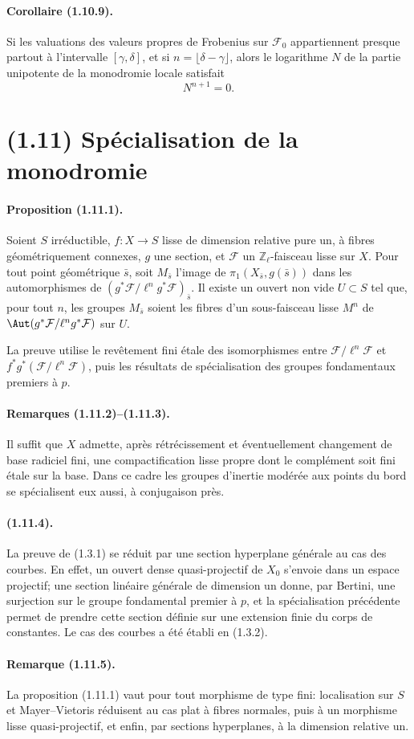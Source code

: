 \paragraph{Corollaire (1.10.9).}
Si les valuations des valeurs propres de Frobenius sur $\mathcal F_0$ appartiennent presque partout à l'intervalle $[\gamma,\delta]$, et si $n=\lfloor\delta-\gamma\rfloor$, alors le logarithme $N$ de la partie unipotente de la monodromie locale satisfait
\[
N^{n+1}=0.
\]

\section*{(1.11) Spécialisation de la monodromie}

\paragraph{Proposition (1.11.1).}
Soient $S$ irréductible, $f:X\to S$ lisse de dimension relative pure un, à fibres géométriquement connexes, $g$ une section, et $\mathcal F$ un $\mathbb Z_\ell$-faisceau lisse sur $X$. Pour tout point géométrique $\bar s$, soit $M_{\bar s}$ l'image de $\pi_1(X_{\bar s},g(\bar s))$ dans les automorphismes de $(g^*\mathcal F/\ell^ng^*\mathcal F)_{\bar s}$. Il existe un ouvert non vide $U\subset S$ tel que, pour tout $n$, les groupes $M_{\bar s}$ soient les fibres d'un sous-faisceau lisse $M^n$ de $\Aut(g^*\mathcal F/\ell^ng^*\mathcal F)$ sur $U$.

La preuve utilise le revêtement fini étale des isomorphismes entre $\mathcal F/\ell^n\mathcal F$ et $f^*g^*(\mathcal F/\ell^n\mathcal F)$, puis les résultats de spécialisation des groupes fondamentaux premiers à $p$.

\paragraph{Remarques (1.11.2)--(1.11.3).}
Il suffit que $X$ admette, après rétrécissement et éventuellement changement de base radiciel fini, une compactification lisse propre dont le complément soit fini étale sur la base. Dans ce cadre les groupes d'inertie modérée aux points du bord se spécialisent eux aussi, à conjugaison près.

\paragraph{(1.11.4).}
La preuve de (1.3.1) se réduit par une section hyperplane générale au cas des courbes. En effet, un ouvert dense quasi-projectif de $X_0$ s'envoie dans un espace projectif; une section linéaire générale de dimension un donne, par Bertini, une surjection sur le groupe fondamental premier à $p$, et la spécialisation précédente permet de prendre cette section définie sur une extension finie du corps de constantes. Le cas des courbes a été établi en (1.3.2).

\paragraph{Remarque (1.11.5).}
La proposition (1.11.1) vaut pour tout morphisme de type fini: localisation sur $S$ et Mayer--Vietoris réduisent au cas plat à fibres normales, puis à un morphisme lisse quasi-projectif, et enfin, par sections hyperplanes, à la dimension relative un.
